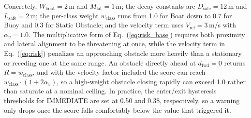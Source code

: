 Concretely, $W_\mathrm{boat}=2$\,m and $M_\mathrm{lat}=1$\,m; the decay constants are $D_\mathrm{safe}=12$\,m and $L_\mathrm{safe}=2$\,m; the per-class weight $w_\mathrm{class}$ runs from 1.0 for Boat down to 0.7 for Buoy and 0.3 for Static Obstacle; and the velocity term uses $V_\mathrm{ref}=3$\,m/s with $\alpha_v=1.0$. The multiplicative form of Eq.~(\ref{eq:risk_base}) requires both proximity and lateral alignment to be threatening at once, while the velocity term in Eq.~(\ref{eq:risk}) penalizes an approaching obstacle more heavily than a stationary or receding one at the same range. An obstacle directly ahead at $d_\mathrm{fwd}=0$ returns $R=w_\mathrm{class}$, and with the velocity factor included the score can reach $w_\mathrm{class} \cdot (1+2\alpha_v)$, so a high-weight obstacle closing rapidly can exceed 1.0 rather than saturate at a nominal ceiling. In practice, the enter/exit hysteresis thresholds for IMMEDIATE are set at 0.50 and 0.38, respectively, so a warning only drops once the score falls comfortably below the value that triggered it.

